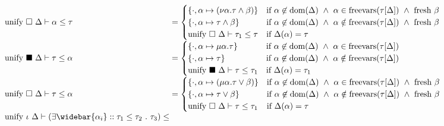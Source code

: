 \documentclass[manuscript]{acmart}
\begin{document}
\[\begin{array}{l @{} l}
    \text{unify } \square\ \Delta \vdash \alpha \leq \tau	
    &{} =
    \begin{cases}  
      \{ \cdot,\alpha \mapsto (\nu\alpha.\tau \wedge \beta) \}
      & \text{if } 
      \alpha \not\in \text{dom}(\Delta) \ \wedge\
      \alpha \in \text{freevars}(\tau[\Delta]) \ \wedge\ 
      \text{fresh } \beta
      \\
      \{ \cdot,\alpha \mapsto \tau \wedge \beta \}
      & \text{if } 
      \alpha \not\in \text{dom}(\Delta) \ \wedge\
      \alpha \notin \text{freevars}(\tau[\Delta]) \ \wedge\ 
      \text{fresh } \beta
      \\
      \text{unify } \square\ \Delta \vdash \tau_1 \leq \tau
      &\text{if }
      \Delta(\alpha) = \tau
    \end{cases}
    \\
    \text{unify } \blacksquare\ \Delta \vdash \tau \leq \alpha 	
    &{} =
    \begin{cases}  
      \{ \cdot,\alpha \mapsto \mu\alpha.\tau \}
      & \text{if } 
      \alpha \not\in \text{dom}(\Delta) \ \wedge\
      \alpha \in \text{freevars}(\tau[\Delta])
      \\
      \{ \cdot,\alpha \mapsto \tau \}
      & \text{if } 
      \alpha \not\in \text{dom}(\Delta) \ \wedge\
      \alpha \notin \text{freevars}(\tau[\Delta])
      \\
      \text{unify } \blacksquare\ \Delta \vdash \tau \leq \tau_1
      &\text{if }
      \Delta(\alpha) = \tau_1
    \end{cases}
    \\
    \text{unify } \square\ \Delta \vdash \tau \leq \alpha	
    &{} =
    \begin{cases}  
      \{ \cdot,\alpha \mapsto (\mu\alpha.\tau \vee \beta) \}
      & \text{if } 
      \alpha \not\in \text{dom}(\Delta) \ \wedge\
      \alpha \in \text{freevars}(\tau[\Delta]) \ \wedge\ 
      \text{fresh } \beta
      \\
      \{ \cdot,\alpha \mapsto \tau \vee \beta \}
      & \text{if } 
      \alpha \not\in \text{dom}(\Delta) \ \wedge\
      \alpha \notin \text{freevars}(\tau[\Delta]) \ \wedge\ 
      \text{fresh } \beta
      \\
      \text{unify } \square\ \Delta \vdash \tau \leq \tau_1
      &\text{if }
      \Delta(\alpha) = \tau
    \end{cases}
    \\
    \text{unify } \iota\ \Delta \vdash
    (\exists \widebar{\alpha_i} :: \tau_1 \leq \tau_2\ .\ \tau_3)
    \leq 

\end{array}\]
\end{document}
